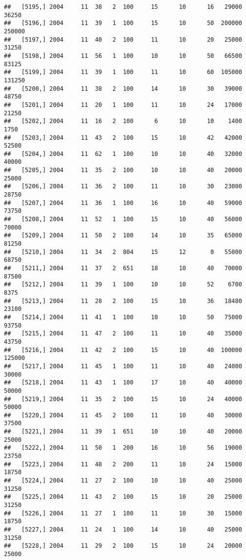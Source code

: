 \documentclass{article}\usepackage[]{graphicx}\usepackage[]{color}
\makeatletter
\newenvironment{kframe}{%
 \def\at@end@of@kframe{}%
 \ifinner\ifhmode%
  \def\at@end@of@kframe{\end{minipage}}%
  \begin{minipage}{\columnwidth}%
 \fi\fi%
 \def\FrameCommand##1{\hskip\@totalleftmargin \hskip-\fboxsep
 \colorbox{shadecolor}{##1}\hskip-\fboxsep
     \hskip-\linewidth \hskip-\@totalleftmargin \hskip\columnwidth}%
 \MakeFramed {\advance\hsize-\width
   \@totalleftmargin\z@ \linewidth\hsize
   \@setminipage}}%
 {\par\unskip\endMakeFramed%
 \at@end@of@kframe}
\newenvironment{knitrout}{}{} %
\makeatother
\begin{document}
\begin{knitrout}
\begin{kframe}
\begin{verbatim}
##   [5195,] 2004     11  38   2  100     15      10      16   29000   36250
##   [5196,] 2004     11  39   1  100     15      10      50  200000  250000
##   [5197,] 2004     11  40   2  100     11      10      20   25000   31250
##   [5198,] 2004     11  56   1  100     10      10      50   66500   83125
##   [5199,] 2004     11  39   1  100     11      10      60  105000  131250
##   [5200,] 2004     11  38   2  100     14      10      30   39000   48750
##   [5201,] 2004     11  20   1  100     11      10      24   17000   21250
##   [5202,] 2004     11  16   2  100      6      10      10    1400    1750
##   [5203,] 2004     11  43   2  100     15      10      42   42000   52500
##   [5204,] 2004     11  62   1  100     10      10      40   32000   40000
##   [5205,] 2004     11  35   2  100     10      10      40   20000   25000
##   [5206,] 2004     11  36   2  100     11      10      30   23000   28750
##   [5207,] 2004     11  36   1  100     16      10      40   59000   73750
##   [5208,] 2004     11  52   1  100     15      10      40   56000   70000
##   [5209,] 2004     11  50   2  100     14      10      35   65000   81250
##   [5210,] 2004     11  34   2  804     15      12       0   55000   68750
##   [5211,] 2004     11  37   2  651     18      10      40   70000   87500
##   [5212,] 2004     11  39   1  100     10      10      52    6700    8375
##   [5213,] 2004     11  28   2  100     15      10      36   18480   23100
##   [5214,] 2004     11  41   1  100     10      10      50   75000   93750
##   [5215,] 2004     11  47   2  100     11      10      40   35000   43750
##   [5216,] 2004     11  42   2  100     15      10      40  100000  125000
##   [5217,] 2004     11  45   1  100     11      10      40   24000   30000
##   [5218,] 2004     11  43   1  100     17      10      40   40000   50000
##   [5219,] 2004     11  35   2  100     15      10      24   40000   50000
##   [5220,] 2004     11  45   2  100     11      10      40   30000   37500
##   [5221,] 2004     11  39   1  651     10      10      40   20000   25000
##   [5222,] 2004     11  50   1  200     16      10      56   19000   23750
##   [5223,] 2004     11  48   2  200     11      10      24   15000   18750
##   [5224,] 2004     11  27   2  100     10      10      40   25000   31250
##   [5225,] 2004     11  43   2  100     15      10      20   25000   31250
##   [5226,] 2004     11  27   1  100     11      10      30   15000   18750
##   [5227,] 2004     11  24   1  100     14      10      40   25000   31250
##   [5228,] 2004     11  29   2  100     15      10      24   20000   25000

\end{verbatim}
\end{kframe}
\end{knitrout}
\end{document}
